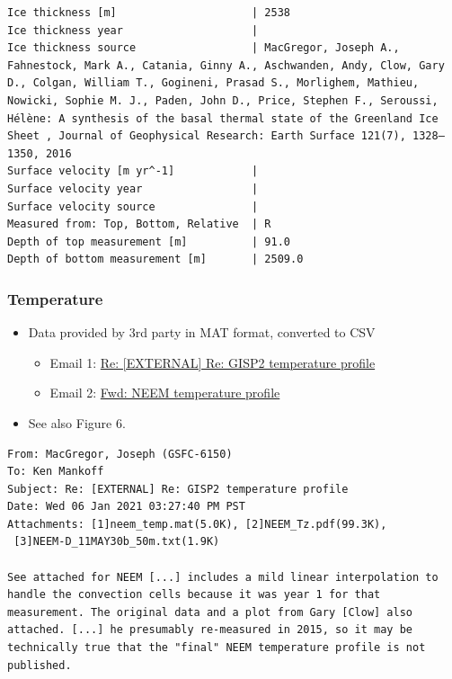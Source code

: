 \documentclass[article,a4paper,times,11pt,twoside]{article}
\begin{document}
\begin{verbatim}
Ice thickness [m]                     | 2538
Ice thickness year                    | 
Ice thickness source                  | MacGregor, Joseph A., Fahnestock, Mark A., Catania, Ginny A., Aschwanden, Andy, Clow, Gary D., Colgan, William T., Gogineni, Prasad S., Morlighem, Mathieu, Nowicki, Sophie M. J., Paden, John D., Price, Stephen F., Seroussi, Hélène: A synthesis of the basal thermal state of the Greenland Ice Sheet , Journal of Geophysical Research: Earth Surface 121(7), 1328–1350, 2016 
Surface velocity [m yr^-1]            | 
Surface velocity year                 | 
Surface velocity source               | 
Measured from: Top, Bottom, Relative  | R
Depth of top measurement [m]          | 91.0
Depth of bottom measurement [m]       | 2509.0
\end{verbatim}

\subsubsection{Temperature}
\label{sec:org4a51c2a}

\begin{itemize}
\item Data provided by 3rd party in MAT format, converted to CSV
\begin{itemize}
\item Email 1: \href{msgid:C1563C1B-084B-428B-9799-26BE88858CD7@nasa.gov}{Re: [EXTERNAL] Re: GISP2 temperature profile}
\item Email 2: \href{msgid:CACoJM5tpXAdV=eayGpZpJ\_oydjTAxc064rNmXHFE5zDKEq\_yYA@mail.gmail.com}{Fwd: NEEM temperature profile}
\end{itemize}
\item See also \textcite{macgregor_2015} Figure 6.
\end{itemize}

\begin{verbatim}
From: MacGregor, Joseph (GSFC-6150)
To: Ken Mankoff
Subject: Re: [EXTERNAL] Re: GISP2 temperature profile
Date: Wed 06 Jan 2021 03:27:40 PM PST
Attachments: [1]neem_temp.mat(5.0K), [2]NEEM_Tz.pdf(99.3K),
 [3]NEEM-D_11MAY30b_50m.txt(1.9K)

See attached for NEEM [...] includes a mild linear interpolation to handle the convection cells because it was year 1 for that measurement. The original data and a plot from Gary [Clow] also attached. [...] he presumably re-measured in 2015, so it may be technically true that the "final" NEEM temperature profile is not published.
\end{verbatim}
\end{document}

